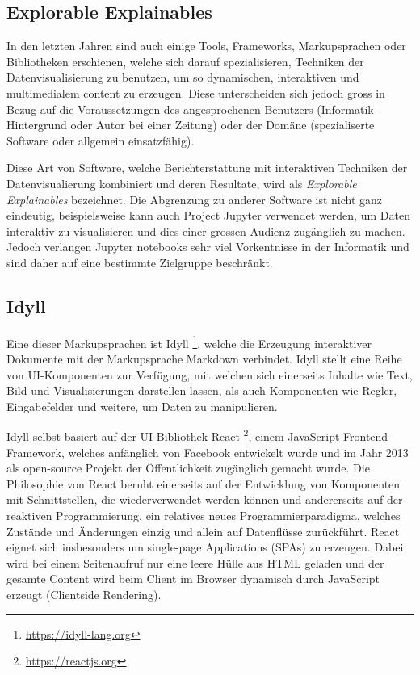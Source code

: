 \documentclass[a4paper,10.2pt,pdftex]{scrartcl}%
\begin{document}
\subsection{Explorable Explainables}
In den letzten Jahren sind auch einige Tools, Frameworks, Markupsprachen oder Bibliotheken erschienen, welche sich darauf spezialisieren, Techniken der Datenvisualisierung zu benutzen, um so dynamischen, interaktiven und multimedialem content zu erzeugen. Diese unterscheiden sich jedoch gross in Bezug auf die Voraussetzungen des angesprochenen Benutzers (Informatik-Hintergrund oder Autor bei einer Zeitung) oder der Domäne (spezialiserte Software oder allgemein einsatzfähig).

Diese Art von Software, welche Berichterstattung mit interaktiven Techniken der Datenvisualierung kombiniert und deren Resultate, wird als \emph{Explorable Explainables} bezeichnet. Die Abgrenzung zu anderer Software ist nicht ganz eindeutig, beispielsweise kann auch Project Jupyter verwendet werden, um Daten interaktiv zu visualisieren und dies einer grossen Audienz zugänglich zu machen. Jedoch verlangen Jupyter notebooks sehr viel Vorkentnisse in der Informatik und sind daher auf eine bestimmte Zielgruppe beschränkt. 
\subsection{Idyll}
Eine dieser Markupsprachen ist Idyll \footnote{\url{https://idyll-lang.org}}, welche die Erzeugung interaktiver Dokumente mit der Markupsprache Markdown verbindet. Idyll stellt eine Reihe von UI-Komponenten zur Verfügung, mit welchen sich einerseits Inhalte wie Text, Bild und Visualisierungen darstellen lassen, als auch Komponenten wie Regler, Eingabefelder und weitere, um Daten zu manipulieren.

Idyll selbst basiert auf der UI-Bibliothek React \footnote{\url{https://reactjs.org}}, einem JavaScript Frontend-Framework, welches anfänglich von Facebook entwickelt wurde und im Jahr 2013 als open-source Projekt der Öffentlichkeit zugänglich gemacht wurde. Die Philosophie von React beruht einerseits auf der Entwicklung von Komponenten mit Schnittstellen, die wiederverwendet werden können und andererseits auf der reaktiven Programmierung, ein relatives neues Programmierparadigma, welches Zustände und Änderungen einzig und allein auf Datenflüsse zurückführt. React eignet sich insbesonders um single-page Applications (SPAs) zu erzeugen. Dabei wird bei einem Seitenaufruf nur eine leere Hülle aus HTML geladen und der gesamte Content wird beim Client im Browser dynamisch durch JavaScript erzeugt (Clientside Rendering).
\end{document}
